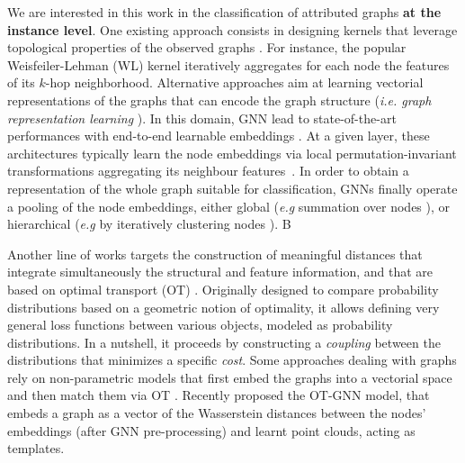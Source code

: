 \documentclass{article}
\begin{document}
We are interested in this work in the classification of attributed graphs {\bf at the instance level}.
One existing approach consists in designing kernels that leverage topological properties of the observed graphs
\cite{borgwardt2005shortest, feragen2013scalable,gartner2003graph,
shervashidze2009efficient}. For instance, the popular
Weisfeiler-Lehman (WL) kernel \cite{shervashidze2011weisfeiler} iteratively aggregates for each node the features of its $k$-hop neighborhood. Alternative approaches aim at learning vectorial
representations of the graphs that can encode the graph structure (\emph{i.e. graph
representation learning} \cite{Chami2022}). 
In this domain, GNN lead to state-of-the-art performances with 
end-to-end learnable embeddings \cite{wu2020comprehensive}. 
At a given layer, these architectures typically
learn the node embeddings via local permutation-invariant transformations
aggregating its neighbour features~\cite{maron2018invariant,kipf2016semi, hamilton2017inductive,
xu2018powerful}. In order to obtain a representation of the whole graph suitable for classification, GNNs finally operate a pooling \cite{knyazev2019understanding, mesquita2020rethinking} of
the node embeddings, either global (\textit{e.g} summation over nodes
\cite{xu2018powerful}), or hierarchical (\textit{e.g} by iteratively clustering nodes \cite{zhang2018end,ying2018hierarchical,  lee2019self}). B

Another line of works targets the construction of meaningful distances that integrate simultaneously the structural and feature information, and that are based on optimal transport (OT) \cite{villani2009optimal, peyre-computational-2020}. Originally designed to compare probability distributions based on a geometric notion of optimality, it allows defining very general loss functions between various objects, modeled as probability distributions. In a nutshell, it proceeds by constructing a \emph{coupling} between the distributions that minimizes a specific \emph{cost}. Some approaches dealing with graphs rely on non-parametric models that first embed the graphs into a vectorial space and then match them via OT \cite{NikolentzosMV17, Togninalli19, kolouri2020wasserstein, maretic2019got}. Recently \citep{chen2020optimal} proposed the OT-GNN model, that embeds a graph as a vector of the Wasserstein distances between the nodes' embeddings (after GNN pre-processing) and learnt point clouds, acting as templates.
\end{document}

